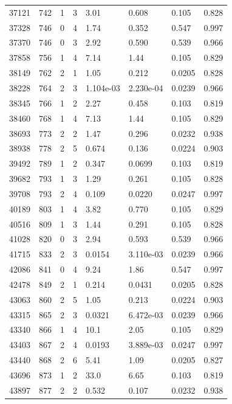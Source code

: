 \documentclass[preview]{standalone}
\begin{document}
{{{{{\begin{tabular}{L{1.2cm}C{1.2cm} C{0.3cm}C{0.5cm} C{1.4cm}C{1.4cm} C{1.4cm}C{1.4cm}}
  37121  &   742  & 1     &  3 &  3.01  & 0.608  & 0.105 &  0.828   \\ 
  37328  &   746  & 0     &  4 &  1.74  & 0.352  & 0.547 &  0.997   \\ 
  37370  &   746  & 0     &  3 &  2.92  & 0.590  & 0.539 &  0.966   \\ 
  37858  &   756  & 1     &  4 &  7.14  & 1.44  & 0.105 &  0.829   \\ 
  38149  &   762  & 2     &  1 &  1.05  & 0.212  & 0.0205 &  0.828   \\ 
  38228  &   764  & 2     &  3 &  1.104e-03  & 2.230e-04  & 0.0239 &  0.966   \\ 
  38345  &   766  & 1     &  2 &  2.27  & 0.458  & 0.103 &  0.819   \\ 
  38460  &   768  & 1     &  4 &  7.13  & 1.44  & 0.105 &  0.829   \\ 
  38693  &   773  & 2     &  2 &  1.47  & 0.296  & 0.0232 &  0.938   \\ 
  38938  &   778  & 2     &  5 &  0.674  & 0.136  & 0.0224 &  0.903   \\ 
  39492  &   789  & 1     &  2 &  0.347  & 0.0699  & 0.103 &  0.819   \\ 
  39682  &   793  & 1     &  3 &  1.29  & 0.261  & 0.105 &  0.828   \\ 
  39708  &   793  & 2     &  4 &  0.109  & 0.0220  & 0.0247 &  0.997   \\ 
  40189  &   803  & 1     &  4 &  3.82  & 0.770  & 0.105 &  0.829   \\ 
  40516  &   809  & 1     &  3 &  1.44  & 0.291  & 0.105 &  0.828   \\ 
  41028  &   820  & 0     &  3 &  2.94  & 0.593  & 0.539 &  0.966   \\ 
  41715  &   833  & 2     &  3 &  0.0154  & 3.110e-03  & 0.0239 &  0.966   \\ 
  42086  &   841  & 0     &  4 &  9.24  & 1.86  & 0.547 &  0.997   \\ 
  42478  &   849  & 2     &  1 &  0.214  & 0.0431  & 0.0205 &  0.828   \\ 
  43063  &   860  & 2     &  5 &  1.05  & 0.213  & 0.0224 &  0.903   \\ 
  43315  &   865  & 2     &  3 &  0.0321  & 6.472e-03  & 0.0239 &  0.966   \\ 
  43340  &   866  & 1     &  4 &  10.1  & 2.05  & 0.105 &  0.829   \\ 
  43403  &   867  & 2     &  4 &  0.0193  & 3.889e-03  & 0.0247 &  0.997   \\ 
  43440  &   868  & 2     &  6 &  5.41  & 1.09  & 0.0205 &  0.827   \\ 
  43696  &   873  & 1     &  2 &  33.0  & 6.65  & 0.103 &  0.819   \\ 
  43897  &   877  & 2     &  2 &  0.532  & 0.107  & 0.0232 &  0.938   \\ 
\hline 
\end{tabular} 

}}}}}
\end{document}
